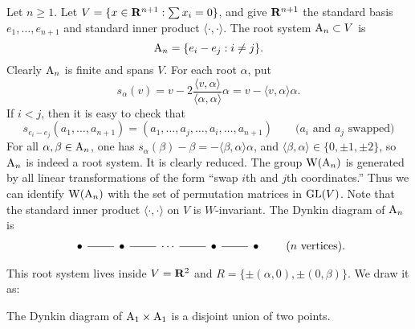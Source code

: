 \begin{example}
Let $n\geqslant 1$. Let $V=\{x\in \mathbf{R}^{n+1}:\sum x_i=0\}$, and give $\mathbf{R}^{n+1}$ 
the standard basis $e_1,\dots,e_{n+1}$ and standard inner product 
$\langle\cdot,\cdot\rangle$. The root system $\mathrm{A}_n\subset V$ is 
\[
  \mathrm{A}_n=\{e_i-e_j:i\ne j\} .
\]
Clearly $\mathrm{A}_n$ is finite and spans $V$. For each root $\alpha$, put 
\[
  s_\alpha(v) = v-2\frac{\langle v,\alpha\rangle}{\langle \alpha,\alpha\rangle} \alpha  = v-\langle v,\alpha\rangle \alpha .
\]
If $i<j$, then it is easy to check that 
\[
  s_{e_i-e_j}(a_1,\dots,a_{n+1}) = (a_1,\dots,a_j,\dots,a_i,\dots,a_{n+1}) \qquad \text{($a_i$ and $a_j$ swapped)}
\]
For all $\alpha,\beta\in \mathrm{A}_n$, one has 
$s_\alpha(\beta)-\beta=-\langle \beta,\alpha\rangle\alpha$, and 
$\langle \beta,\alpha\rangle\in \{0,\pm 1,\pm 2\}$, so $\mathrm{A}_n$ is indeed 
a root system. It is clearly reduced. The group $\operatorname{W}(\mathrm{A}_n)$ is generated 
by all linear transformations of the form ``swap $i$th and $j$th coordinates.'' 
Thus we can identify $\operatorname{W}(\mathrm{A}_n)$ with the set of permutation matrices 
in $\operatorname{GL}(V)$. Note that the standard inner product $\langle\cdot,\cdot\rangle$ 
on $V$ is $W$-invariant. The Dynkin diagram of $\mathrm{A}_n$ is 
\[
\begin{tikzcd}
  \bullet \ar[r, dash] 
    & \bullet \ar[r, dash] 
    & \cdots \ar[r, dash] 
    & \bullet \ar[r, dash] 
    & \bullet
\end{tikzcd}
\qquad\text{($n$ vertices)} .
\]
\end{example}

\begin{example}
This root system lives inside $V=\mathbf{R}^2$ and 
$R=\{\pm (\alpha,0),\pm (0,\beta)\}$. We draw it as: 
\begin{center}
\end{center}
The Dynkin diagram of $\mathrm{A}_1\times \mathrm{A}_1$ is a disjoint union of 
two points. 
\end{example}


